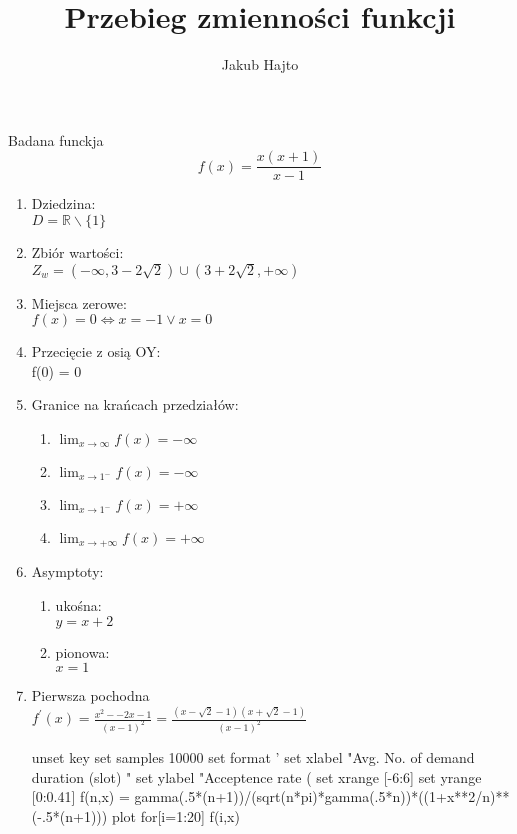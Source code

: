 \documentclass[11pt]{scrartcl}
\title{Przebieg zmienności funkcji}
\author{Jakub Hajto}
\begin{document}
	\maketitle
	\begin{center}
	Badana funckja $$ f(x) = \frac{x(x+1)}{x-1} $$
	\end{center}
	\begin{enumerate}  
		\item Dziedzina: \\
			$ D = \mathbb{R} \backslash \{1\} $
		\item Zbiór wartości: \\
			$ Z_w = (-\infty, 3 - 2\sqrt{2}) \cup (3 + 2\sqrt{2}, + \infty) $
		\item Miejsca zerowe: \\
			$ f(x) = 0 \Longleftrightarrow x = -1 \vee x = 0 $
		\item Przecięcie z osią OY: \\
			f(0) = 0
		\item Granice na krańcach przedziałów:
			\begin{enumerate}
				\item $ \lim_{x\to\infty} f(x) = -\infty $
				\item $ \lim_{x\to1^-} f(x) = -\infty $
				\item $ \lim_{x\to1^-} f(x) = +\infty $
				\item $ \lim_{x\to+\infty} f(x) = +\infty $
			\end{enumerate}
		\item Asymptoty:
			\begin{enumerate}
				\item ukośna: \\
					$ y = x + 2$
				\item pionowa: \\
					$ x=1 $
			\end{enumerate}
		\item Pierwsza pochodna \\
			$ f^{\prime}(x) = \frac{x^2 - -2x -1}{(x-1)^2} =  \frac{(x- \sqrt{2} - 1)(x + \sqrt{2} - 1)}{(x-1)^2} $
			\begin{gnuplot}[terminal=pdf,terminaloptions=color]
				unset key
				set samples 10000
				set format '%
				set xlabel "Avg. No. of demand duration (slot) "
				set ylabel "Acceptence rate (%
				set xrange [-6:6]
				set yrange [0:0.41]
				f(n,x) = gamma(.5*(n+1))/(sqrt(n*pi)*gamma(.5*n))*((1+x**2/n)**(-.5*(n+1)))
				plot for[i=1:20] f(i,x)
			\end{gnuplot}

\end{enumerate}
\end{document}
